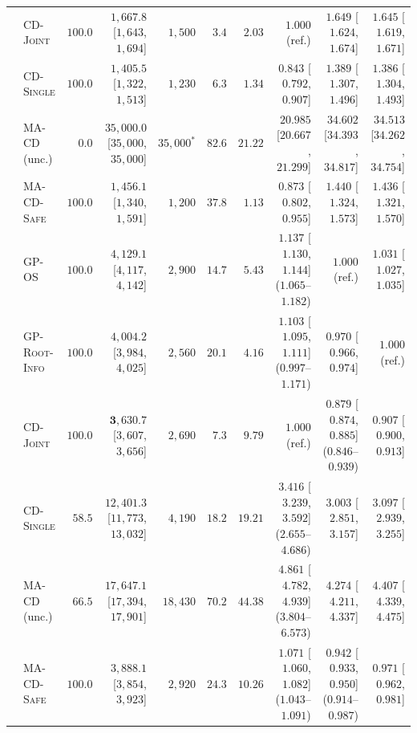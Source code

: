 \documentclass{article}
\theoremstyle{plain}
\theoremstyle{definition}
\begin{document}
\begin{table}[!htbp]
{\begin{tabular}{@{}llrrrrrrrr@{}}
  & \textsc{CD-Joint}          & $100.0$ & $1{,}667.8$ [$1{,}643$, $1{,}694$]   & $1{,}500$  & $3.4$  & $2.03$ & $1.000$ (ref.)             & $1.649$ [$1.624$, $1.674$] & $1.645$ [$1.619$, $1.671$] \\
  & \textsc{CD-Single}         & $100.0$ & $1{,}405.5$ [$1{,}322$, $1{,}513$]   & $1{,}230$  & $6.3$  & $1.34$ & $0.843$ [$0.792$, $0.907$] & $1.389$ [$1.307$, $1.496$] & $1.386$ [$1.304$, $1.493$] \\
  & \textsc{MA-CD} (unc.)      & $0.0$   & $35{,}000.0$ [$35{,}000$, $35{,}000$] & $35{,}000^*$ & $82.6$ & $21.22$ & $20.985$ [$20.667$, $21.299$] & $34.602$ [$34.393$, $34.817$] & $34.513$ [$34.262$, $34.754$] \\
  & \textsc{MA-CD-Safe}        & $100.0$ & $1{,}456.1$ [$1{,}340$, $1{,}591$]   & $1{,}200$  & $37.8$ & $1.13$ & $\mathbf{0.873}$ [$0.802$, $0.955$] & $1.440$ [$1.324$, $1.573$] & $1.436$ [$1.321$, $1.570$] \\
\midrule
{}
  & \textsc{GP-OS}             & $100.0$ & $4{,}129.1$ [$4{,}117$, $4{,}142$]   & $2{,}900$  & $14.7$ & $5.43$ & $1.137$ [$1.130$, $1.144$] ($1.065$--$1.182$) & $1.000$ (ref.) & $1.031$ [$1.027$, $1.035$] \\
  & \textsc{GP-Root-Info}      & $100.0$ & $4{,}004.2$ [$3{,}984$, $4{,}025$]   & $2{,}560$  & $20.1$ & $4.16$ & $1.103$ [$1.095$, $1.111$] ($0.997$--$1.171$) & $0.970$ [$0.966$, $0.974$] & $1.000$ (ref.) \\
  & \textsc{CD-Joint}          & $100.0$ & $\mathbf{3{,}630.7}$ [$3{,}607$, $3{,}656$] & $2{,}690$  & $7.3$  & $9.79$ & $1.000$ (ref.) & $\mathbf{0.879}$ [$0.874$, $0.885$] ($0.846$--$0.939$) & $\mathbf{0.907}$ [$0.900$, $0.913$] \\
  & \textsc{CD-Single}         & $58.5$  & $12{,}401.3$ [$11{,}773$, $13{,}032$] & $4{,}190$  & $18.2$ & $19.21$ & $3.416$ [$3.239$, $3.592$] ($2.655$--$4.686$) & $3.003$ [$2.851$, $3.157$] & $3.097$ [$2.939$, $3.255$] \\
  & \textsc{MA-CD} (unc.)      & $66.5$  & $17{,}647.1$ [$17{,}394$, $17{,}901$] & $18{,}430$ & $70.2$ & $44.38$ & $4.861$ [$4.782$, $4.939$] ($3.804$--$6.573$) & $4.274$ [$4.211$, $4.337$] & $4.407$ [$4.339$, $4.475$] \\
  & \textsc{MA-CD-Safe}        & $100.0$ & $3{,}888.1$ [$3{,}854$, $3{,}923$]   & $2{,}920$  & $24.3$ & $10.26$ & $1.071$ [$1.060$, $1.082$] ($1.043$--$1.091$) & $\mathbf{0.942}$ [$0.933$, $0.950$] ($0.914$--$0.987$) & $\mathbf{0.971}$ [$0.962$, $0.981$] \\

\end{tabular}}
\end{table}
\end{document}
